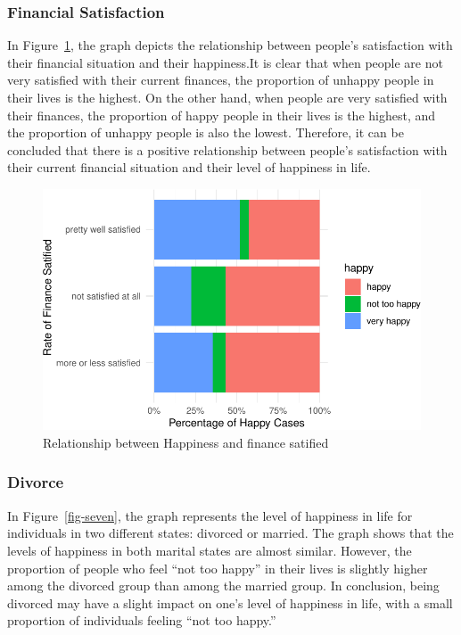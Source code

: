 \documentclass[
  letterpaper,
  DIV=11,
  numbers=noendperiod]{scrartcl}
\begin{document}
\hypertarget{financial-satisfaction}{%
\subsubsection{Financial Satisfaction}\label{financial-satisfaction}}

In Figure~\ref{fig-six}, the graph depicts the relationship between
people's satisfaction with their financial situation and their
happiness.It is clear that when people are not very satisfied with their
current finances, the proportion of unhappy people in their lives is the
highest. On the other hand, when people are very satisfied with their
finances, the proportion of happy people in their lives is the highest,
and the proportion of unhappy people is also the lowest. Therefore, it
can be concluded that there is a positive relationship between people's
satisfaction with their current financial situation and their level of
happiness in life.

\begin{figure}

{\centering \includegraphics{paper_files/figure-pdf/fig-six-1.pdf}

}

\caption{\label{fig-six}Relationship between Happiness and finance
satified}

\end{figure}

\hypertarget{divorce}{%
\subsubsection{Divorce}\label{divorce}}

In Figure~\ref{fig-seven}, the graph represents the level of happiness
in life for individuals in two different states: divorced or married.
The graph shows that the levels of happiness in both marital states are
almost similar. However, the proportion of people who feel ``not too
happy'' in their lives is slightly higher among the divorced group than
among the married group. In conclusion, being divorced may have a slight
impact on one's level of happiness in life, with a small proportion of
individuals feeling ``not too happy.''
\end{document}
